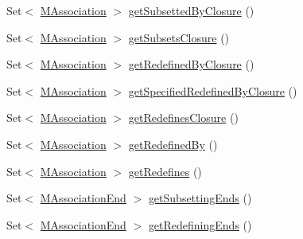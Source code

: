 \begin{DoxyCompactItemize}
\item 
Set$<$ \hyperlink{interfaceorg_1_1tzi_1_1use_1_1uml_1_1mm_1_1_m_association}{M\-Association} $>$ \hyperlink{classorg_1_1tzi_1_1use_1_1uml_1_1mm_1_1_m_association_class_impl_a0569d09f725acc7a11472ce4807bf591}{get\-Subsetted\-By\-Closure} ()
\item 
Set$<$ \hyperlink{interfaceorg_1_1tzi_1_1use_1_1uml_1_1mm_1_1_m_association}{M\-Association} $>$ \hyperlink{classorg_1_1tzi_1_1use_1_1uml_1_1mm_1_1_m_association_class_impl_a68900595075abf16c094c21e74a7b487}{get\-Subsets\-Closure} ()
\item 
Set$<$ \hyperlink{interfaceorg_1_1tzi_1_1use_1_1uml_1_1mm_1_1_m_association}{M\-Association} $>$ \hyperlink{classorg_1_1tzi_1_1use_1_1uml_1_1mm_1_1_m_association_class_impl_a027c63cd635ef63286d0889f63d017b9}{get\-Redefined\-By\-Closure} ()
\item 
Set$<$ \hyperlink{interfaceorg_1_1tzi_1_1use_1_1uml_1_1mm_1_1_m_association}{M\-Association} $>$ \hyperlink{classorg_1_1tzi_1_1use_1_1uml_1_1mm_1_1_m_association_class_impl_a2b35f946527c01a7fe9923cb3f4114b8}{get\-Specified\-Redefined\-By\-Closure} ()
\item 
Set$<$ \hyperlink{interfaceorg_1_1tzi_1_1use_1_1uml_1_1mm_1_1_m_association}{M\-Association} $>$ \hyperlink{classorg_1_1tzi_1_1use_1_1uml_1_1mm_1_1_m_association_class_impl_a1a525976d65b2c8c0808837c5914706e}{get\-Redefines\-Closure} ()
\item 
Set$<$ \hyperlink{interfaceorg_1_1tzi_1_1use_1_1uml_1_1mm_1_1_m_association}{M\-Association} $>$ \hyperlink{classorg_1_1tzi_1_1use_1_1uml_1_1mm_1_1_m_association_class_impl_a080593472ac1f3773c1a113d1ddd1fe7}{get\-Redefined\-By} ()
\item 
Set$<$ \hyperlink{interfaceorg_1_1tzi_1_1use_1_1uml_1_1mm_1_1_m_association}{M\-Association} $>$ \hyperlink{classorg_1_1tzi_1_1use_1_1uml_1_1mm_1_1_m_association_class_impl_af05f480fb0982be7ab4848c7244e3ff4}{get\-Redefines} ()
\item 
Set$<$ \hyperlink{classorg_1_1tzi_1_1use_1_1uml_1_1mm_1_1_m_association_end}{M\-Association\-End} $>$ \hyperlink{classorg_1_1tzi_1_1use_1_1uml_1_1mm_1_1_m_association_class_impl_a13f8d2f3bd8003ae8986b5d6ae33791f}{get\-Subsetting\-Ends} ()
\item 
Set$<$ \hyperlink{classorg_1_1tzi_1_1use_1_1uml_1_1mm_1_1_m_association_end}{M\-Association\-End} $>$ \hyperlink{classorg_1_1tzi_1_1use_1_1uml_1_1mm_1_1_m_association_class_impl_a59baf223ea9c59c3736c61f937f4a6be}{get\-Redefining\-Ends} ()
\item 

\end{DoxyCompactItemize}
